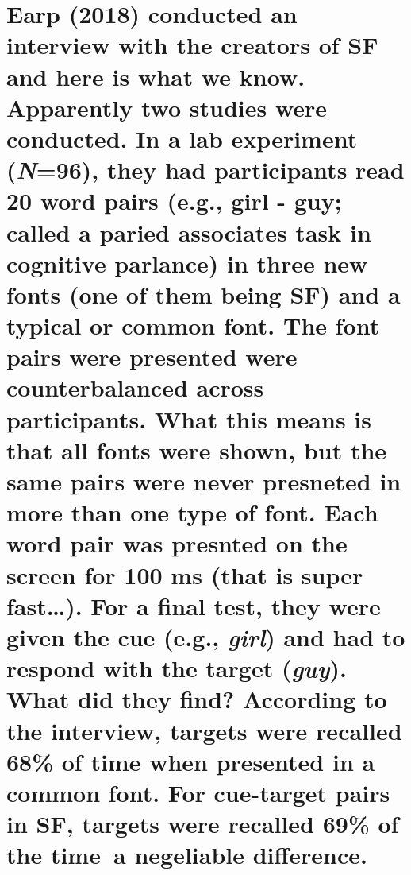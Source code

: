 \documentclass[doc]{apa6}
\begin{document}
{\section{\texorpdfstring{Earp (2018) conducted an interview with the creators of SF and here is what we know. Apparently two studies were conducted. In a lab experiment (\emph{N}=96), they had participants read 20 word pairs (e.g., girl - guy; called a paried associates task in cognitive parlance) in three new fonts (one of them being SF) and a typical or common font. The font pairs were presented were counterbalanced across participants. What this means is that all fonts were shown, but the same pairs were never presneted in more than one type of font. Each word pair was presnted on the screen for 100 ms (that is super fast\ldots{}). For a final test, they were given the cue (e.g., \emph{girl}) and had to respond with the target (\emph{guy}). What did they find? According to the interview, targets were recalled 68\% of time when presented in a common font. For cue-target pairs in SF, targets were recalled 69\% of the time--a negeliable difference.}{Earp (2018) conducted an interview with the creators of SF and here is what we know. Apparently two studies were conducted. In a lab experiment (N=96), they had participants read 20 word pairs (e.g., girl - guy; called a paried associates task in cognitive parlance) in three new fonts (one of them being SF) and a typical or common font. The font pairs were presented were counterbalanced across participants. What this means is that all fonts were shown, but the same pairs were never presneted in more than one type of font. Each word pair was presnted on the screen for 100 ms (that is super fast\ldots{}). For a final test, they were given the cue (e.g., girl) and had to respond with the target (guy). What did they find? According to the interview, targets were recalled 68\% of time when presented in a common font. For cue-target pairs in SF, targets were recalled 69\% of the time--a negeliable difference.}}\label{earp-2018-conducted-an-interview-with-the-creators-of-sf-and-here-is-what-we-know.-apparently-two-studies-were-conducted.-in-a-lab-experiment-n96-they-had-participants-read-20-word-pairs-e.g.-girl---guy-called-a-paried-associates-task-in-cognitive-parlance-in-three-new-fonts-one-of-them-being-sf-and-a-typical-or-common-font.-the-font-pairs-were-presented-were-counterbalanced-across-participants.-what-this-means-is-that-all-fonts-were-shown-but-the-same-pairs-were-never-presneted-in-more-than-one-type-of-font.-each-word-pair-was-presnted-on-the-screen-for-100-ms-that-is-super-fast.-for-a-final-test-they-were-given-the-cue-e.g.-girl-and-had-to-respond-with-the-target-guy.-what-did-they-find-according-to-the-interview-targets-were-recalled-68-of-time-when-presented-in-a-common-font.-for-cue-target-pairs-in-sf-targets-were-recalled-69-of-the-timea-negeliable-difference.}}
\end{document}
